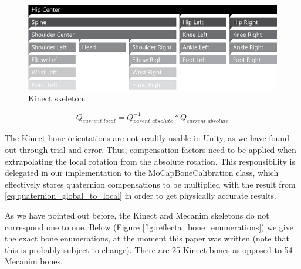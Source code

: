 \documentclass[a4paper, 12pt]{amsart}
\begin{document}
\begin{figure}[htb]
\centering
\includegraphics[width=.9\linewidth]{fig_kinect_skeleton}
\caption{Kinect skeleton.}
\label{fig:kinect_skeleton}
\end{figure}

\begin{equation} \label{eq:quaternion_global_to_local}
Q_{current\_local} = Q_{parent\_absolute}^{-1} * Q_{current\_absolute}
\end{equation}

The Kinect bone orientations are not readily usable in Unity, as we have found out through trial and error. Thus, compensation factors need to be applied when extrapolating the local rotation from the absolute rotation. This responsibility is delegated in our implementation to the MoCapBoneCalibration class, which effectively stores quaternion compensations to be multiplied with the result from \eqref{eq:quaternion_global_to_local} in order to get physically accurate results.

As we have pointed out before, the Kinect and Mecanim skeletons do not correspond one to one. Below (Figure \ref{fig:reflecta_bone_enumerations}) we give the exact bone enumerations, at the moment this paper was written (note that this is probably subject to change). There are 25 Kinect bones as opposed to 54 Mecanim bones.
\end{document}
